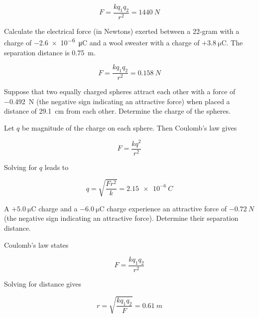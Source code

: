 \documentclass[]{exam}
\begin{document}
\begin{questions}
\begin{solution}
\begin{equation*}
    F = \frac{kq_1q_2}{r^2} = \SI{1440}{N}
\end{equation*}
\end{solution}

\question
Calculate the electrical force (in Newtons) exerted between a 22-gram with a charge of \SI{-2.6e-6}{\micro\coulomb} and a wool sweater with a charge of $+\SI{3.8}{\micro\coulomb}$. The separation distance is \SI{0.75}{m}.

\begin{solution}
\begin{equation*}
    F = \frac{k q_1 q_2}{r^2} = \SI{0.158}{N}
\end{equation*}
\end{solution}

\question
Suppose that two equally charged spheres attract each other with a force of \SI{-0.492}{N} (the negative sign indicating an attractive force) when placed a distance of \SI{29.1}{cm} from each other. Determine the charge of the spheres. 

\begin{solution}
Let $q$ be magnitude of the charge on each sphere. Then Coulomb's law gives

\begin{equation*}
    F = \frac{kq^2}{r^2}
\end{equation*}

Solving for $q$ leads to 

\begin{equation*}
    q = \sqrt{\frac{Fr^2}{k}} = \boxed{\SI{2.15e-6}{C}}
\end{equation*}
\end{solution}

\question
A $+\SI{5.0}{\micro\coulomb}$ charge and a $-\SI{6.0}{\micro\coulomb}$ charge experience an attractive force of $-\SI{0.72}{N}$ (the negative sign indicating an attractive force). Determine their separation distance.

\begin{solution}
Coulomb's law states

\begin{equation*}
    F = \frac{kq_1q_2}{r^2}
\end{equation*}

Solving for distance gives

\begin{equation*}
    r = \sqrt{\frac{kq_1q_2}{F}} = \boxed{\SI{0.61}{m}}
\end{equation*}
\end{solution}
\end{questions}
\end{document}

